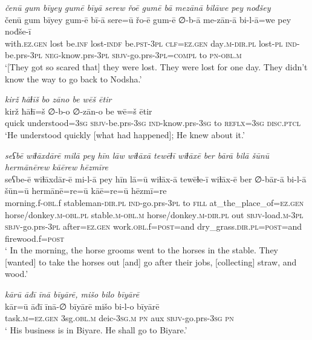 \ea \label{ŠJ.39}
\textit{čenū gum bīyey gumē bīyā serew řoē gumē bā mezānā bilāwe pey nođšey} \\ 
\gll čenū gum bīyey gum-ē bī-ā sere=ū řo-ē gum-ē ∅-b-ā me-zān-ā bi-l-ā=we pey nođše-ī \\ 
 with\textsc{.ez.gen} lost be\textsc{.inf} lost\textsc{-indf} be\textsc{.pst}\textsc{-3pl} \textsc{clf}\textsc{=ez.gen} day\textsc{.m}\textsc{-dir}\textsc{.pl} lost\textsc{\textsc{-pl}} \textsc{ind-}be.prs\textsc{-3pl} \textsc{neg-}know.prs\textsc{-3pl} \textsc{sbjv-}go.prs\textsc{-3pl}\textsc{=compl} to \textsc{pn}\textsc{-obl}\textsc{.m} \\ 
\glt `[They got so scared that] they were lost. They were lost for one day. They didn’t know the way to go back to Nodsha.'
\z 
 
\ea \label{ŠJ.50}
\textit{kirž ħāɫīš bo zāno be wēš ētir} \\ 
\gll kirž ħāɫī=š ∅-b-o ∅-zān-o be wē=š ētir \\ 
 quick understood\textsc{=3sg} \textsc{sbjv-}be.prs\textsc{-3sg} \textsc{ind-}know.prs\textsc{-3sg} to \textsc{reflx}\textsc{=3sg} \textsc{disc.ptcl} \\ 
\glt `He understood quickly [what had happened]; He knew about it.'
\z 
 
\ea \label{ŠJ.66}
\textit{seʕbē wiɫāxdārē milā pey hīn lāw wiɫāxā tewēɫī wiɫāxē ber bārā bilā šūnū hermānērew kāērew hēzmīre} \\ 
\gll seʕbe-ē wiɫāxdār-ē mi-l-ā pey hīn lā=ū wiɫāx-ā tewēɫe-ī wiɫāx-ē ber ∅-bār-ā bi-l-ā šūn=ū hermānē=re=ū kāē=re=ū hēzmī=re \\ 
 morning.f\textsc{-obl}.f stableman\textsc{-dir}\textsc{.pl} \textsc{ind-}go.prs\textsc{-3pl} to \textsc{fill} at\_the\_place\_of\textsc{=ez.gen} horse/donkey\textsc{.m}\textsc{-obl}\textsc{.pl} stable\textsc{.m}\textsc{-obl}\textsc{.m} horse/donkey\textsc{.m}\textsc{-dir}\textsc{.pl} out \textsc{sbjv-}load\textsc{.m}\textsc{-3pl} \textsc{sbjv-}go.prs\textsc{-3pl} after\textsc{=ez.gen} work\textsc{.obl}.f\textsc{=\textsc{post}}=and dry\_grass\textsc{.dir}\textsc{.pl}\textsc{=\textsc{post}}=and firewood.f\textsc{=\textsc{post}} \\ 
\glt ` In the morning, the horse grooms went to the horses in the stable. They [wanted] to take the horses out [and] go after their jobs, [collecting] straw, and wood.'
\z 
 
\ea \label{ŠJ.75}
\textit{kārū āđī īnā bīyārē, mišo bilo bīyārē} \\ 
\gll kār=ū āđī īnā-∅ bīyārē mišo bi-l-o bīyārē \\ 
 task\textsc{.m}\textsc{=ez.gen} 3sg\textsc{.obl}\textsc{.m} deic\textsc{-3sg}\textsc{.m} \textsc{pn} aux \textsc{sbjv-}go.prs\textsc{-3sg} \textsc{pn} \\ 
\glt ` His business is in Biyare. He shall go to Biyare.'
\z 
 
